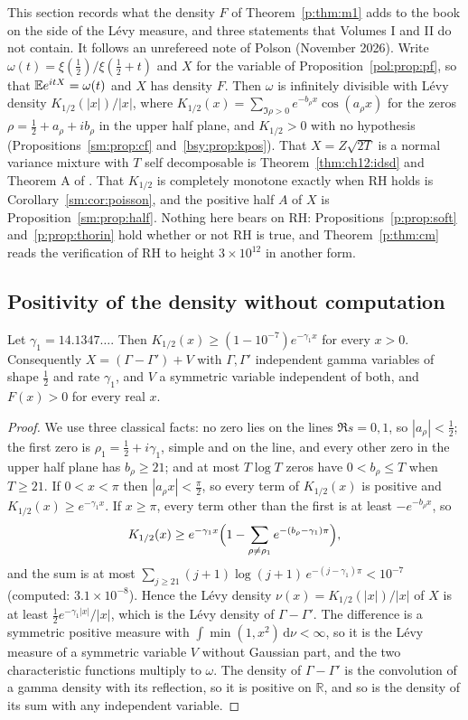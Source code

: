 This section records what the density $F$ of Theorem~\ref{p:thm:m1} adds to the book on the side of the Lévy measure, and three statements that Volumes I and II do not contain. It follows an unrefereed note of Polson (November 2026). Write $\omega(t)=\xi(\frac12)/\xi(\frac12+t)$ and $X$ for the variable of Proposition~\ref{pol:prop:pf}, so that $\mathbb{E} e^{itX}=\omega(t)$ and $X$ has density $F$. Then $\omega$ is infinitely divisible with Lévy density $K_{1/2}(|x|)/|x|$, where $K_{1/2}(x)=\sum_{\Im\rho>0}e^{-b_\rho x}\cos(a_\rho x)$ for the zeros $\rho=\frac12+a_\rho+ib_\rho$ in the upper half plane, and $K_{1/2}>0$ with no hypothesis (Propositions~\ref{sm:prop:cf} and~\ref{bsy:prop:kpos}). That $X=Z\sqrt{2T}$ is a normal variance mixture with $T$ self decomposable is Theorem~\ref{thm:ch12:idsd} and Theorem A of \cite{P26}. That $K_{1/2}$ is completely monotone exactly when RH holds is Corollary~\ref{sm:cor:poisson}, and the positive half $A$ of $X$ is Proposition~\ref{sm:prop:half}. Nothing here bears on RH: Propositions~\ref{p:prop:soft} and~\ref{p:prop:thorin} hold whether or not RH is true, and Theorem~\ref{p:thm:cm} reads the verification of RH to height $3\times10^{12}$ in another form.

\subsection{Positivity of the density without computation}

\begin{proposition}\label{p:prop:soft}
Let $\gamma_1=14.1347\ldots$. Then $K_{1/2}(x)\ge(1-10^{-7})e^{-\gamma_1x}$ for every $x>0$. Consequently $X=(\Gamma-\Gamma')+V$ with $\Gamma,\Gamma'$ independent gamma variables of shape $\frac12$ and rate $\gamma_1$, and $V$ a symmetric variable independent of both, and $F(x)>0$ for every real $x$.
\end{proposition}

\begin{proof}
We use three classical facts: no zero lies on the lines $\Re s=0,1$, so $|a_\rho|<\frac12$; the first zero is $\rho_1=\frac12+i\gamma_1$, simple and on the line, and every other zero in the upper half plane has $b_\rho\ge21$; and at most $T\log T$ zeros have $0<b_\rho\le T$ when $T\ge21$. If $0<x<\pi$ then $|a_\rho x|<\frac\pi2$, so every term of $K_{1/2}(x)$ is positive and $K_{1/2}(x)\ge e^{-\gamma_1x}$. If $x\ge\pi$, every term other than the first is at least $-e^{-b_\rho x}$, so
\[
K_{1/2}(x)\ge e^{-\gamma_1x}\Bigl(1-\sum_{\rho\ne\rho_1}e^{-(b_\rho-\gamma_1)\pi}\Bigr),
\]
and the sum is at most $\sum_{j\ge21}(j+1)\log(j+1)\,e^{-(j-\gamma_1)\pi}<10^{-7}$ (computed: $3.1\times10^{-8}$). Hence the Lévy density $\nu(x)=K_{1/2}(|x|)/|x|$ of $X$ is at least $\frac12e^{-\gamma_1|x|}/|x|$, which is the Lévy density of $\Gamma-\Gamma'$. The difference is a symmetric positive measure with $\int\min(1,x^2)\,\mathrm d\nu<\infty$, so it is the Lévy measure of a symmetric variable $V$ without Gaussian part, and the two characteristic functions multiply to $\omega$. The density of $\Gamma-\Gamma'$ is the convolution of a gamma density with its reflection, so it is positive on $\mathbb R$, and so is the density of its sum with any independent variable.
\end{proof}

